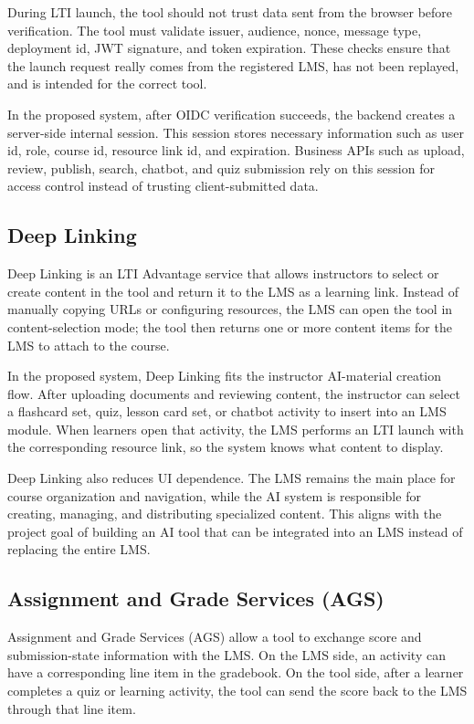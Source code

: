 During LTI launch, the tool should not trust data sent from the browser
before verification. The tool must validate issuer, audience, nonce,
message type, deployment id, JWT signature, and token expiration. These
checks ensure that the launch request really comes from the registered
LMS, has not been replayed, and is intended for the correct tool.

In the proposed system, after OIDC verification succeeds, the backend
creates a server-side internal session. This session stores necessary
information such as user id, role, course id, resource link id, and
expiration. Business APIs such as upload, review, publish, search,
chatbot, and quiz submission rely on this session for access control
instead of trusting client-submitted data.

\subsection{Deep Linking}
\label{subsec:deep-linking}

Deep Linking is an LTI Advantage service that allows instructors to
select or create content in the tool and return it to the LMS as a
learning link. Instead of manually copying URLs or configuring resources,
the LMS can open the tool in content-selection mode; the tool then returns
one or more content items for the LMS to attach to the course.

In the proposed system, Deep Linking fits the instructor AI-material
creation flow. After uploading documents and reviewing content, the
instructor can select a flashcard set, quiz, lesson card set, or chatbot
activity to insert into an LMS module. When learners open that activity,
the LMS performs an LTI launch with the corresponding resource link, so
the system knows what content to display.

Deep Linking also reduces UI dependence. The LMS remains the main place
for course organization and navigation, while the AI system is responsible
for creating, managing, and distributing specialized content. This aligns
with the project goal of building an AI tool that can be integrated into
an LMS instead of replacing the entire LMS.

\subsection{Assignment and Grade Services (AGS)}
\label{subsec:assignment-grade-services}

Assignment and Grade Services (AGS) allow a tool to exchange score and
submission-state information with the LMS. On the LMS side, an activity
can have a corresponding line item in the gradebook. On the tool side,
after a learner completes a quiz or learning activity, the tool can send
the score back to the LMS through that line item.

